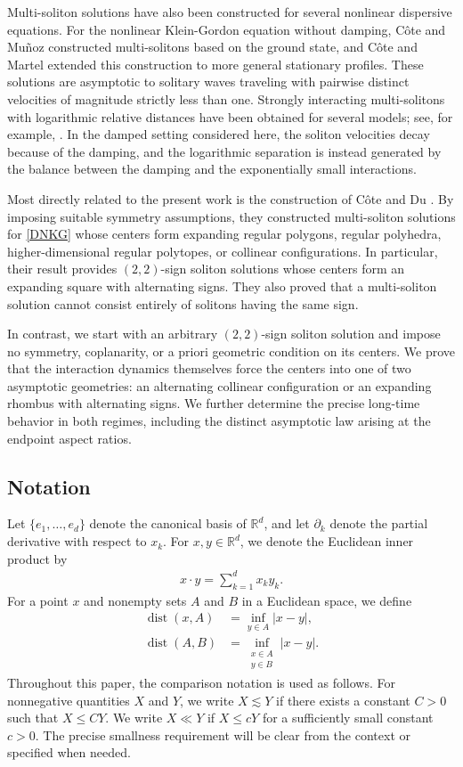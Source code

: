 \documentclass[reqno]{amsart}
\theoremstyle{plain}
\theoremstyle{definition}
\numberwithin{equation}{section}
\begin{document}
Multi-soliton solutions have also been constructed for several nonlinear dispersive equations. For the nonlinear Klein-Gordon equation without damping, C\^{o}te and Mu\~{n}oz \cite{CM} constructed multi-solitons based on the ground state, and C\^{o}te and Martel \cite{CM1} extended this construction to more general stationary profiles. These solutions are asymptotic to solitary waves traveling with pairwise distinct velocities of magnitude strictly less than one. Strongly interacting multi-solitons with logarithmic relative distances have been obtained for several models; see, for example, \cite{A,GI,MN,N1,N2}. In the damped setting considered here, the soliton velocities decay because of the damping, and the logarithmic separation is instead generated by the balance between the damping and the exponentially small interactions.

Most directly related to the present work is the construction of C\^{o}te and Du \cite{CD}. By imposing suitable symmetry assumptions, they constructed multi-soliton solutions for \eqref{DNKG} whose centers form expanding regular polygons, regular polyhedra, higher-dimensional regular polytopes, or collinear configurations. In particular, their result provides $(2,2)$-sign soliton solutions whose centers form an expanding square with alternating signs. They also proved that a multi-soliton solution cannot consist entirely of solitons having the same sign.

In contrast, we start with an arbitrary $(2,2)$-sign soliton solution and impose no symmetry, coplanarity, or a priori geometric condition on its centers. We prove that the interaction dynamics themselves force the centers into one of two asymptotic geometries: an alternating collinear configuration or an expanding rhombus with alternating signs. We further determine the precise long-time behavior in both regimes, including the distinct asymptotic law arising at the endpoint aspect ratios. 

\subsection{Notation}

Let $\{e_1,\ldots,e_d\}$ denote the canonical basis of $\mathbb{R}^d$, and let ${\partial}_k$ denote the partial derivative
with respect to $x_k$. For $x,y\in\mathbb{R}^d$, we denote the Euclidean inner product by
\begin{align}\label{Euclideanproduct}
x\cdot y=\sum_{k=1}^d x_k y_k.
\end{align}
For a point $x$ and nonempty sets $A$ and $B$ in a Euclidean space, we define
\begin{align*}
\operatorname{dist}(x,A)
&=\inf_{y\in A}|x-y|,
\\
\operatorname{dist}(A,B)
&=\inf_{\substack{x\in A\\y\in B}}|x-y|.
\end{align*}
Throughout this paper, the comparison notation is used as follows. For nonnegative quantities $X$ and $Y$, we write $X\lesssim Y$ if there exists a constant $C>0$ such that $X\leq CY$. We write $X\ll Y$ if $X\leq cY$ for a sufficiently small constant $c>0$. The precise smallness requirement will be clear from the context or specified when needed.
\end{document}
